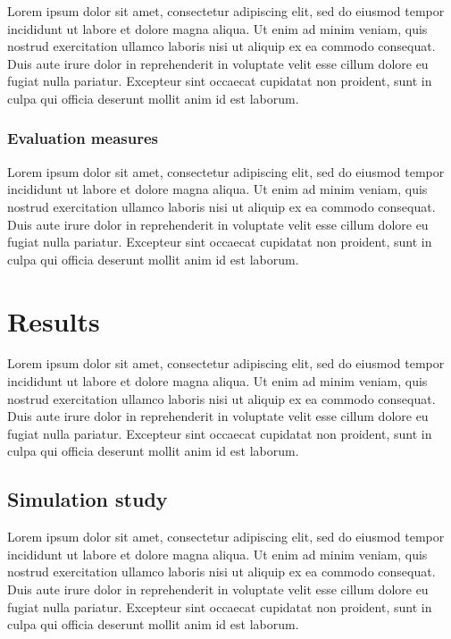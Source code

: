\documentclass[preprint, 3p,
authoryear]{elsarticle} %
\begin{document}
Lorem ipsum dolor sit amet, consectetur adipiscing elit, sed do eiusmod
tempor incididunt ut labore et dolore magna aliqua. Ut enim ad minim
veniam, quis nostrud exercitation ullamco laboris nisi ut aliquip ex ea
commodo consequat. Duis aute irure dolor in reprehenderit in voluptate
velit esse cillum dolore eu fugiat nulla pariatur. Excepteur sint
occaecat cupidatat non proident, sunt in culpa qui officia deserunt
mollit anim id est laborum.

\hypertarget{evaluation-measures}{%
\subsubsection{Evaluation measures}\label{evaluation-measures}}

Lorem ipsum dolor sit amet, consectetur adipiscing elit, sed do eiusmod
tempor incididunt ut labore et dolore magna aliqua. Ut enim ad minim
veniam, quis nostrud exercitation ullamco laboris nisi ut aliquip ex ea
commodo consequat. Duis aute irure dolor in reprehenderit in voluptate
velit esse cillum dolore eu fugiat nulla pariatur. Excepteur sint
occaecat cupidatat non proident, sunt in culpa qui officia deserunt
mollit anim id est laborum.

\hypertarget{results}{%
\section{Results}\label{results}}

Lorem ipsum dolor sit amet, consectetur adipiscing elit, sed do eiusmod
tempor incididunt ut labore et dolore magna aliqua. Ut enim ad minim
veniam, quis nostrud exercitation ullamco laboris nisi ut aliquip ex ea
commodo consequat. Duis aute irure dolor in reprehenderit in voluptate
velit esse cillum dolore eu fugiat nulla pariatur. Excepteur sint
occaecat cupidatat non proident, sunt in culpa qui officia deserunt
mollit anim id est laborum.

\hypertarget{simulation-study-1}{%
\subsection{Simulation study}\label{simulation-study-1}}

Lorem ipsum dolor sit amet, consectetur adipiscing elit, sed do eiusmod
tempor incididunt ut labore et dolore magna aliqua. Ut enim ad minim
veniam, quis nostrud exercitation ullamco laboris nisi ut aliquip ex ea
commodo consequat. Duis aute irure dolor in reprehenderit in voluptate
velit esse cillum dolore eu fugiat nulla pariatur. Excepteur sint
occaecat cupidatat non proident, sunt in culpa qui officia deserunt
mollit anim id est laborum.
\end{document}
